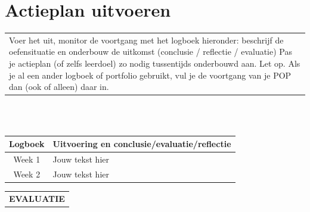 \documentclass[12pt, a4paper, dutch]{article}
\begin{document}
\section{\small Actieplan uitvoeren} \label{section:Actieplan_Uitvoeren}
\begin{tabular}{p{}}
    \cellcolor{lightgray!30}\tiny Voer het uit, monitor de voortgang met het logboek hieronder: beschrijf de oefensituatie en onderbouw de uitkomst (conclusie / reflectie / evaluatie) Pas je actieplan (of zelfs leerdoel) zo nodig tussentijds onderbouwd aan. Let op. Als je al een ander logboek of portfolio gebruikt, vul je de voortgang van je POP dan (ook of alleen) daar in.
\end{tabular}\\\\

\begin{tabular}{c|p{}}
    \toprule
    \cellcolor{lightgray!40}Logboek & \cellcolor{lightgray!40}Uitvoering en conclusie/evaluatie/reflectie \\
    \midrule
    Week 1 & Jouw tekst hier \\
    \midrule
    Week 2 & Jouw tekst hier \\
    \bottomrule
\end{tabular}
\pagebreak






















\begin{tabular}{p{}}\\
    \cellcolor{lightgray!65}\centering \large \vspace{-5pt} \textbf{EVALUATIE}
\end{tabular}
\end{document}
